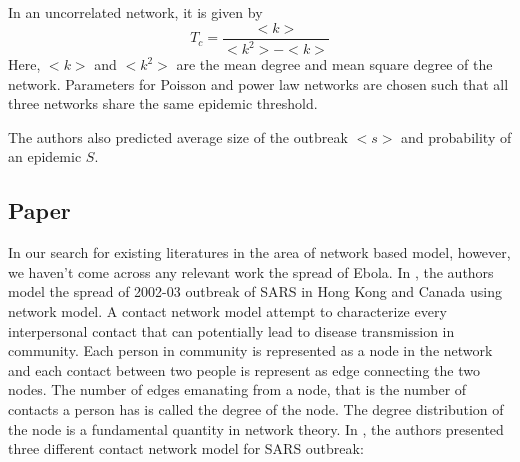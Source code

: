 \documentclass[12pt, journal,onecolumn]{IEEEtran}
\begin{document}
In an uncorrelated network, it is given by
\[
T_c =\dfrac{<k>}{<k^2> - <k>}
\]
Here, $<k>$ and $<k^2>$ are the mean degree and mean square degree of the network. Parameters for Poisson and power law networks are chosen such that all three networks share the same epidemic threshold.

The authors also predicted average size of the outbreak $<s>$ and probability of an epidemic $S$. 



\subsection{Paper \cite{meyers2005network}}
In our search for existing literatures in the area of network based model, however, we haven't come across any relevant work the spread of Ebola. In \cite{meyers2005network}, the authors model the spread of 2002-03 outbreak of SARS in Hong Kong and Canada using network model. A contact network model attempt to characterize every interpersonal contact that can potentially lead to disease transmission in community. Each person in community is represented as a node in the network and each contact between two people is represent as edge connecting the two nodes. The number of edges emanating from a node, that is the number of contacts a person has is called the degree of the node. The degree distribution of the node is a fundamental quantity in network theory.   In \cite{meyers2005network}, the authors presented three different contact network model for SARS outbreak:
\end{document}
